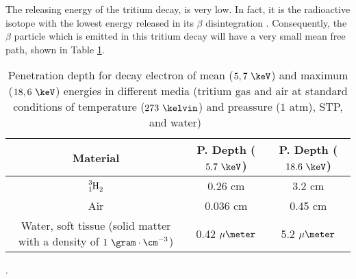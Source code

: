 

The releasing energy of the tritium decay, is very low. In fact, it is the radioactive isotope with the lowest energy released in its $\beta$ disintegration \cite{TritiumHandling}. Consequently, the $\beta$ particle which is emitted in this tritium decay will have a very small mean free path, shown in Table \ref{tab:MeanFreePathTritium}.

\begin{table}[htbp]
\begin{center}
\begin{tabular}{|c|c|c|}
\hline
Material & P. Depth ($5.7~\keV$) & P. Depth ($18.6~\keV$)\\
\hline \hline \hline
$\ce{\ce{^{3}_{1}H_2}}$ & 0.26 cm & 3.2 cm \\ \hline
Air & 0.036 cm & 0.45 cm \\ \hline
\parbox{10em}{\centering Water, soft tissue\\  (solid matter with a \\  density of $1~\gram\cdot\cm^{-3}$)} & 0.42 $\mu\meter$ & 5.2 $\mu\meter$ \\ \hline
\end{tabular}
\caption{Penetration depth for decay electron of mean ($5,7~\keV$) and maximum ($18,6~\keV$) energies in different media (tritium gas and air at standard conditions of temperature ($273~\kelvin$) and preassure ($1$ atm), STP, and water)~\cite{MeanFreePathDocument}}.
\label{tab:MeanFreePathTritium}
\end{center}
\end{table}

